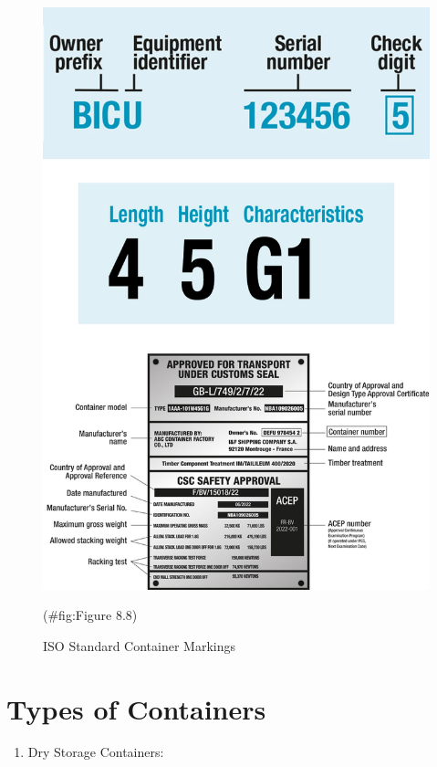 \documentclass[
]{book}
\providecommand{\tightlist}{%
  \setlength{\itemsep}{0pt}\setlength{\parskip}{0pt}}
\begin{document}
\begin{figure}

{\centering \includegraphics{./Images/seaport operation/ISO Standard Container Markings} 

}

\caption{ISO Standard Container Markings}(\#fig:Figure 8.8)
\end{figure}

\hypertarget{seaport-types}{%
\section{Types of Containers}\label{seaport-types}}

\begin{enumerate}
\def\labelenumi{\arabic{enumi}.}
\tightlist
\item
  Dry Storage Containers:
\end{enumerate}
\end{document}
